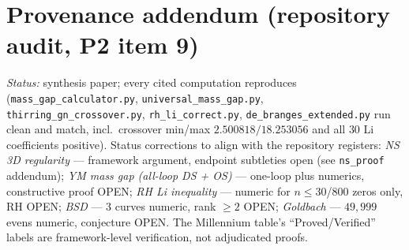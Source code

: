 \documentclass[11pt]{article}
\begin{document}
\section*{Provenance addendum (repository audit, P2 item 9)}

{\small
\emph{Status:} synthesis paper; every cited computation reproduces
(\texttt{mass\_gap\_calculator.py}, \texttt{universal\_mass\_gap.py},
\texttt{thirring\_gn\_crossover.py}, \texttt{rh\_li\_correct.py},
\texttt{de\_branges\_extended.py} run clean and match, incl.\ crossover
min/max $2.500818/18.253056$ and all $30$ Li coefficients positive).
Status corrections to align with the repository registers:
\emph{NS 3D regularity} --- framework argument, endpoint subtleties open
(see \texttt{ns\_proof} addendum); \emph{YM mass gap (all-loop DS + OS)} ---
one-loop plus numerics, constructive proof OPEN; \emph{RH Li inequality} ---
numeric for $n\le30$/$800$ zeros only, RH OPEN; \emph{BSD} --- 3 curves
numeric, rank $\ge 2$ OPEN; \emph{Goldbach} --- $49{,}999$ evens numeric,
conjecture OPEN.  The Millennium table's ``Proved/Verified'' labels are
framework-level verification, not adjudicated proofs.}
\end{document}
